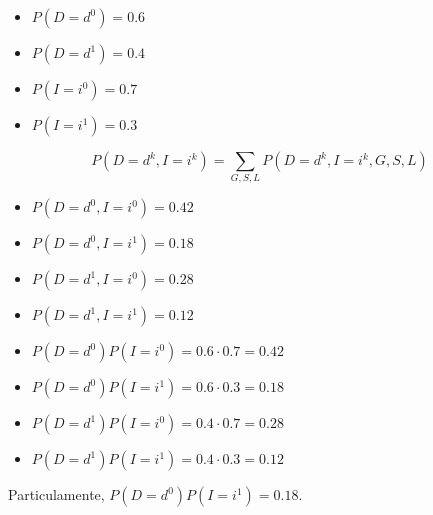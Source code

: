 \begin{itemize}
    \item $P(D = {d^0}) = 0.6$
    \item $P(D = {d^1}) = 0.4$
    \item $P(I = {i^0}) = 0.7$
    \item $P(I = {i^1}) = 0.3$
\end{itemize}

\[P(D = {d^k},I = {i^k}) = \sum\limits_{G,S,L} {P(D = {d^k},I = {i^k},G,S,L)} \]

\begin{itemize}
    \item $P(D = {d^0},I = {i^0}) = 0.42$
    \item $P(D = {d^0},I = {i^1}) = 0.18$
    \item $P(D = {d^1},I = {i^0}) = 0.28$
    \item $P(D = {d^1},I = {i^1}) = 0.12$
\end{itemize}

\begin{itemize}
	\item $P(D = {d^0})P(I = {i^0}) = 0.6 \cdot 0.7 = 0.42$
	\item $P(D = {d^0})P(I = {i^1}) = 0.6 \cdot 0.3 = 0.18$
	\item $P(D = {d^1})P(I = {i^0}) = 0.4 \cdot 0.7 = 0.28$
	\item $P(D = {d^1})P(I = {i^1}) = 0.4 \cdot 0.3 = 0.12$
\end{itemize}

Particulamente, $P(D = {d^0})P(I = {i^1}) = 0.18$.